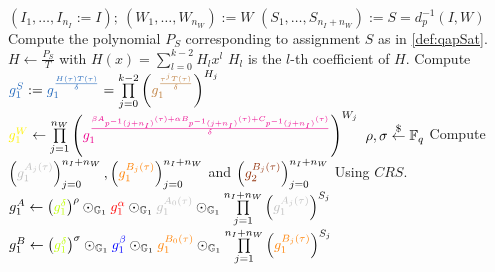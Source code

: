 \begin{Algorithmus}[h] %
    \caption{Procedure to compute a proof for a \gls{g16snark} using a $CRS$ as computed by \cref{alg:setupG16}, instance $I$ and witness $W$.
    Here, the \gls{g16snark} $GSNARK(DR(QAP(R1CS_r), d_p))$ is based on $params:=(\mathbb{G}_1, \mathbb{G}_2, e(\cdot,\cdot),g_1,g_2,\mathbb{F}_q)$.
    Moreover, $r:\mathbb{F}_q^m\to\mathbb{F}_q^n$ and $DR(QAP(R1CS_r), d_p):\mathcal{I}\times\mathcal{W}\to\{0,1\}$, where $d_p:\mathcal{A}\to\mathcal{I}\times\mathcal{W}$, $\mathcal{I}=\mathbb{F}_q^{n_I}, \mathcal{W}=\mathbb{F}_q^{n_W}$ with $n_I + n_W=m+n+s$ and $\mathcal{A}=\mathbb{F}_q^{m+n+s}$.
    Additionally, $QAP(R1CS)=\left\{T\right\}\cup \bigcup_{j=0}^{m+n+s}\left\{\left(A_j, B_j, C_j\right)\right\}$ and $k:=deg(T)$ is the number of constraints in the \gls{qap}.
    }
    \label{alg:proveG16}
    \begin{algorithmic}
        \State $(I_1,\dots, I_{n_I}:=I);\:(W_1,\dots, W_{n_W}):=W$
        \State $(S_1,\dots, S_{n_I+n_W}):=S=d_p^{-1}(I,W)$
        \State Compute the polynomial $P_S$ corresponding to assignment $S$ as in \cref{def:qapSat}.
        \State $H\gets \frac{P_S}{T}$ with $H(x)=\sum\limits_{l=0}^{k-2}H_{l}x^{l}$ \Comment $H_{l}$ is the $l$-th coefficient of $H$.
        \Statex 
        \State Compute $\textcolor{NavyBlue}{g_1^S}:=\textcolor{NavyBlue}{g_1^{\frac{H(\tau)T(\tau)}{\delta}}}=\prod\limits_{j=0}^{k-2}\left(\textcolor{brown}{g_1^{\frac{\tau^jT(\tau)}{\delta}}}\right)^{H_j}$
        \State $\textcolor{yellow}{g_1^{W}}\gets \prod\limits_{j=1}^{n_W}\left(\textcolor{magenta}{g_1^\frac{\beta A_{p^{-1}(j+n_I)}(\tau)+\alpha B_{p^{-1}(j+n_I)}(\tau) + C_{p^{-1}(j+n_I)}(\tau)}{\delta}}\right)^{W_j}$
        \State $\rho, \sigma\overset{\$}{\gets} \mathbb{F}_q$
        \Statex
        \State Compute $\left(\textcolor{lightgray}{g_1^{A_j(\tau)}}\right)_{j=0}^{n_I+n_W}, \left(\textcolor{orange}{g_1^{B_j(\tau)}}\right)_{j=0}^{n_I+n_W}$ and $\left(\textcolor{RawSienna}{g_2^{B_j(\tau)}}\right)_{j=0}^{n_I+n_W}$ \Comment Using $CRS$. \footnotemark
        \Statex
        \State $g_1^A\gets \left(\textcolor{lime}{g_1^\delta}\right)^\rho\odot_{\mathbb{G}_1} \textcolor{red}{g_1^\alpha}\odot_{\mathbb{G}_1} \textcolor{lightgray}{g_1^{A_0(\tau)}}\odot_{\mathbb{G}_1} \prod\limits_{j=1}^{n_I+n_W}\left(\textcolor{lightgray}{g_1^{A_j(\tau)}}\right)^{S_j}$
        \State $g_1^B\gets \left(\textcolor{lime}{g_1^\delta}\right)^\sigma\odot_{\mathbb{G}_1} \textcolor{blue}{g_1^\beta} \odot_{\mathbb{G}_1} \textcolor{orange}{g_1^{B_0(\tau)}}\odot_{\mathbb{G}_1} \prod\limits_{j=1}^{n_I+n_W}\left(\textcolor{orange}{g_1^{B_j(\tau)}}\right)^{S_j}$

\end{algorithmic}
\end{Algorithmus}

